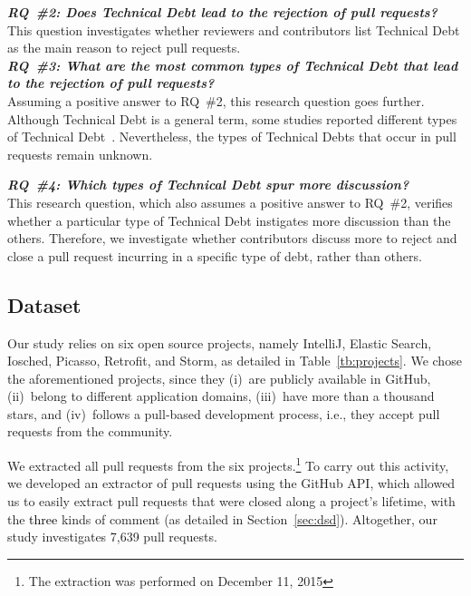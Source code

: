 \documentclass{sig-alternate}
\begin{document}
\newcommand{\rqii}{{\noindent\centering\bf\em RQ~\#2: Does Technical Debt lead to the rejection of pull requests?}} 
\rqii\\[-0.2cm]

This question investigates whether reviewers and contributors list Technical Debt as the main reason to reject pull requests.\\

\newcommand{\rqiii}{{\noindent\centering\bf\em RQ~\#3: What are the most common types of Technical Debt that lead to the rejection of pull requests?}} 
\rqiii\\[-0.2cm]

Assuming a positive answer to RQ~\#2, this research question goes further. Although Technical Debt is a general term, some studies reported different types of Technical Debt~\cite{1}. 
%
Nevertheless, the types of Technical Debts that occur in pull requests remain unknown.

\newcommand{\rqiv}{{\noindent\centering\bf\em RQ~\#4: 
Which types of Technical Debt spur more discussion? 
}}
\rqiv\\[-0.2cm]


This research question, which also assumes a positive answer to RQ~\#2,
verifies whether a particular type of Technical Debt instigates more discussion
than the others.
Therefore, we investigate whether contributors discuss more to reject and close a pull request
incurring in a specific type of debt, rather than others.


\subsection{Dataset}
Our study relies on six open source projects, namely IntelliJ, Elastic Search, Iosched, Picasso, Retrofit, and Storm, as detailed in Table~\ref{tb:projects}. We chose the aforementioned projects, since they (i)~are publicly available in GitHub, (ii)~belong to different application domains, (iii)~have more than a thousand stars, and (iv)~follows a pull-based development process, i.e., they accept pull requests from the community.

We extracted all pull requests from the six projects.\footnote{The extraction was performed on December 11, 2015}
To carry out this activity, we developed an extractor of pull requests using the GitHub API, which allowed us to easily extract pull requests that were closed along a project’s lifetime, with the \textcolor{black}{three} kinds of comment (as detailed in Section~\ref{sec:dsd}). 
%
Altogether, our study investigates 7,639 pull requests. 
\end{document}
